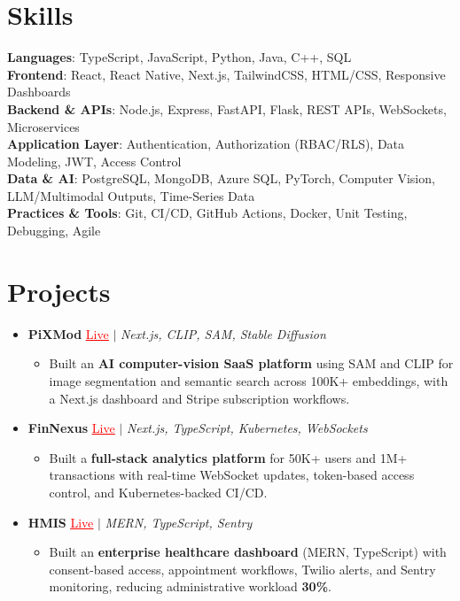 \documentclass[letterpaper,10pt]{article}
\newcommand{\resumeItem}[1]{\item\small{{#1 \vspace{-2pt}}}}
\newcommand{\resumeProjectHeading}[1]{\item \small #1 \vspace{-2pt}}
\newcommand{\resumeSubHeadingListStart}{\begin{itemize}[leftmargin=0.0in, label={}]}
\newcommand{\resumeSubHeadingListEnd}{\end{itemize}}
\newcommand{\resumeProjItemListStart}{\begin{itemize}[leftmargin=0.15in,label=\textbullet,itemsep=0pt,topsep=0pt,parsep=0pt,partopsep=0pt]}
\newcommand{\resumeProjItemListEnd}{\end{itemize}\vspace{-4pt}}
\begin{document}
\section{Skills}
\begin{itemize}[leftmargin=0.15in, label={}]
\small{\item{
\textbf{Languages}: TypeScript, JavaScript, Python, Java, C++, SQL \\
\textbf{Frontend}: React, React Native, Next.js, TailwindCSS, HTML/CSS, Responsive Dashboards \\
\textbf{Backend \& APIs}: Node.js, Express, FastAPI, Flask, REST APIs, WebSockets, Microservices \\
\textbf{Application Layer}: Authentication, Authorization (RBAC/RLS), Data Modeling, JWT, Access Control \\
\textbf{Data \& AI}: PostgreSQL, MongoDB, Azure SQL, PyTorch, Computer Vision, LLM/Multimodal Outputs, Time-Series Data \\
\textbf{Practices \& Tools}: Git, CI/CD, GitHub Actions, Docker, Unit Testing, Debugging, Agile
}}
\end{itemize}
\vspace{-6pt}
\section{Projects}
\resumeSubHeadingListStart
\vspace{-2pt}
\resumeProjectHeading{\textbf{PiXMod} {\href{https://pixmod.vercel.app/}{\textcolor{red}{\underline{Live}}}} $|$ \emph{Next.js, CLIP, SAM, Stable Diffusion}}
\resumeProjItemListStart
\resumeItem{Built an \textbf{AI computer-vision SaaS platform} using SAM and CLIP for image segmentation and semantic search across 100K+ embeddings, with a Next.js dashboard and Stripe subscription workflows.}
\resumeProjItemListEnd
\vspace{3pt}
\resumeProjectHeading{\textbf{FinNexus} {\href{https://fin-nexus.vercel.app/}{\textcolor{red}{\underline{Live}}}} $|$ \emph{Next.js, TypeScript, Kubernetes, WebSockets}}
\resumeProjItemListStart
\resumeItem{Built a \textbf{full-stack analytics platform} for 50K+ users and 1M+ transactions with real-time WebSocket updates, token-based access control, and Kubernetes-backed CI/CD.}
\resumeProjItemListEnd
\vspace{3pt}
\resumeProjectHeading{\textbf{HMIS} {\href{https://hims-rouge.vercel.app/}{\textcolor{red}{\underline{Live}}}} $|$ \emph{MERN, TypeScript, Sentry}}
\resumeProjItemListStart
\resumeItem{Built an \textbf{enterprise healthcare dashboard} (MERN, TypeScript) with consent-based access, appointment workflows, Twilio alerts, and Sentry monitoring, reducing administrative workload \textbf{30\%}.}
\resumeProjItemListEnd
\resumeSubHeadingListEnd
\end{document}
